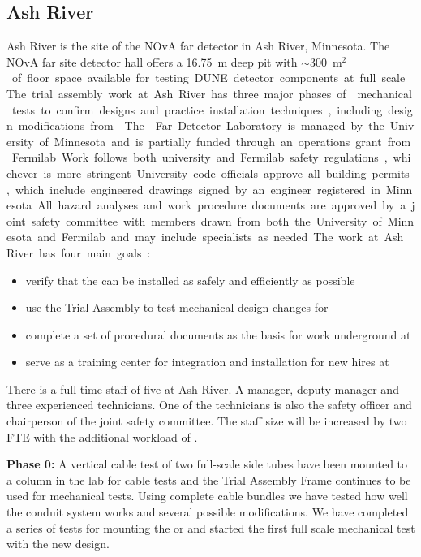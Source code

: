 \subsection{Ash River}

Ash River is the site of the NOvA far detector in Ash River,
Minnesota. The NOvA far site detector hall offers a \SI{16.75}{m} deep
pit with $\sim$\SI{300}{m$^2$} of floor space available for testing
DUNE detector components at full scale.  The trial assembly work at
Ash River has three major phases of  mechanical tests to
confirm designs and practice installation techniques, including design
modifications from .  The  Far Detector
Laboratory is managed by the University of Minnesota and is partially
funded through an operations grant from Fermilab.  Work follows both
university and Fermilab safety regulations, whichever is more
stringent. University code officials approve all building
permits, which include engineered drawings signed by an engineer
registered in Minnesota. All hazard analyses and work procedure
documents are approved by a joint safety committee with members drawn
from both the University of Minnesota and Fermilab and may include
specialists as needed.

The work at Ash River has four main goals:
\begin{itemize}
  \item verify that the   can be installed as
    safely and efficiently as possible
  \item use the  Trial Assembly  to test
    mechanical design changes for 
  \item complete a set of procedural documents as the basis for work
    underground at \surf
  \item serve as a training center for  integration and
      installation for new hires at \surf
\end{itemize}

There is a full time staff of five  at Ash River. A
manager, deputy manager and three experienced technicians.  One of the
technicians is also the safety officer and chairperson of the joint
safety committee. The staff size will be increased by two FTE with the
additional workload of .

{\bf Phase 0:} A vertical cable test of two full-scale 
side tubes have been mounted to a column in the lab for cable tests
and the  Trial Assembly Frame continues to be used
for  mechanical tests. Using complete cable
bundles we have tested how well the conduit system works and several
possible modifications. We have completed a series of tests for
mounting the  or  and started the first
full scale mechanical  test with the new design.


